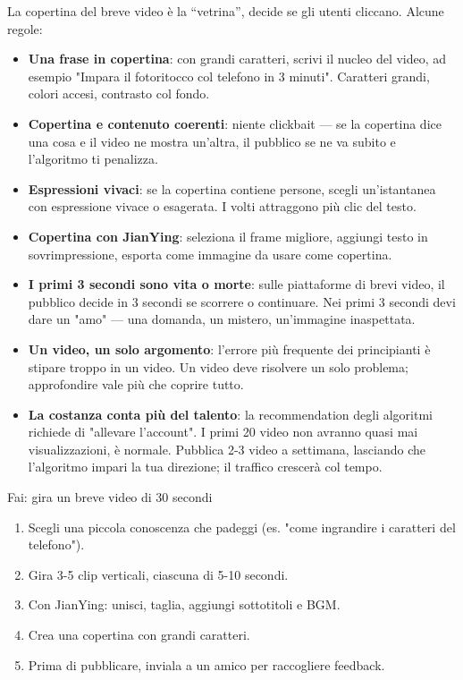 
La copertina del breve video è la “vetrina”, decide se gli utenti cliccano. Alcune regole:

\begin{itemize}
  \item \textbf{Una frase in copertina}: con grandi caratteri, scrivi il nucleo del video, ad esempio "Impara il fotoritocco col telefono in 3 minuti". Caratteri grandi, colori accesi, contrasto col fondo.
  \item \textbf{Copertina e contenuto coerenti}: niente clickbait — se la copertina dice una cosa e il video ne mostra un'altra, il pubblico se ne va subito e l'algoritmo ti penalizza.
  \item \textbf{Espressioni vivaci}: se la copertina contiene persone, scegli un'istantanea con espressione vivace o esagerata. I volti attraggono più clic del testo.
  \item \textbf{Copertina con JianYing}: seleziona il frame migliore, aggiungi testo in sovrimpressione, esporta come immagine da usare come copertina.
\end{itemize}


\begin{itemize}
  \item \textbf{I primi 3 secondi sono vita o morte}: sulle piattaforme di brevi video, il pubblico decide in 3 secondi se scorrere o continuare. Nei primi 3 secondi devi dare un "amo" — una domanda, un mistero, un'immagine inaspettata.
  \item \textbf{Un video, un solo argomento}: l'errore più frequente dei principianti è stipare troppo in un video. Un video deve risolvere un solo problema; approfondire vale più che coprire tutto.
  \item \textbf{La costanza conta più del talento}: la recommendation degli algoritmi richiede di "allevare l'account". I primi 20 video non avranno quasi mai visualizzazioni, è normale. Pubblica 2-3 video a settimana, lasciando che l'algoritmo impari la tua direzione; il traffico crescerà col tempo.
\end{itemize}

\begin{tcbpractice}{Fai: gira un breve video di 30 secondi}
\begin{enumerate}
  \item Scegli una piccola conoscenza che padeggi (es. "come ingrandire i caratteri del telefono").
  \item Gira 3-5 clip verticali, ciascuna di 5-10 secondi.
  \item Con JianYing: unisci, taglia, aggiungi sottotitoli e BGM.
  \item Crea una copertina con grandi caratteri.
  \item Prima di pubblicare, inviala a un amico per raccogliere feedback.
\end{enumerate}

\end{tcbpractice}

